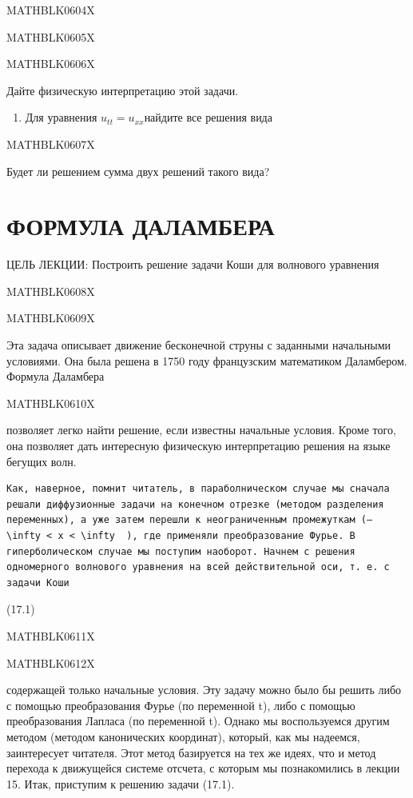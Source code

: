 \documentclass[
]{article}
\providecommand{\tightlist}{%
  \setlength{\itemsep}{0pt}\setlength{\parskip}{0pt}}
\begin{document}
{{MATHBLK0604X

MATHBLK0605X

MATHBLK0606X

Дайте физическую интерпретацию этой задачи.

\begin{enumerate}
\def\labelenumi{\arabic{enumi}.}
\setcounter{enumi}{3}
\tightlist
\item
  Для уравнения \(u_{tt} = u_{xx}\)найдите все решения вида
\end{enumerate}

MATHBLK0607X

Будет ли решением сумма двух решений такого вида?

\section{ФОРМУЛА
ДАЛАМБЕРА}\label{ux444ux43eux440ux43cux443ux43bux430-ux434ux430ux43bux430ux43cux431ux435ux440ux430}

ЦЕЛЬ ЛЕКЦИИ: Построить решение задачи Коши для волнового уравнения

MATHBLK0608X

MATHBLK0609X

Эта задача описывает движение бесконечной струны с заданными начальными
условиями. Она была решена в 1750 году французским математиком
Даламбером. Формула Даламбера

MATHBLK0610X

позволяет легко найти решение, если известны начальные условия. Кроме
того, она позволяет дать интересную физическую интерпретацию решения на
языке бегущих волн.

\begin{verbatim}
Как, наверное, помнит читатель, в параболническом случае мы сначала решали диффузионные задачи на конечном отрезке (методом разделения переменных), а уже затем перешли к неограниченным промежуткам (—   \infty < x < \infty  ), где применяли преобразование Фурье. В гиперболическом случае мы поступим наоборот. Начнем с решения одномерного волнового уравнения на всей действительной оси, т. е. с задачи Коши
\end{verbatim}

(17.1)

MATHBLK0611X

MATHBLK0612X

содержащей только начальные условия. Эту задачу можно было бы решить
либо с помощью преобразования Фурье (по переменной t), либо с помощью
преобразования Лапласа (по переменной t). Однако мы воспользуемся другим
методом (методом канонических координат), который, как мы надеемся,
заинтересует читателя. Этот метод базируется на тех же идеях, что и
метод перехода к движущейся системе отсчета, с которым мы познакомились
в лекции 15. Итак, приступим к решению задачи (17.1).

}}
\end{document}
